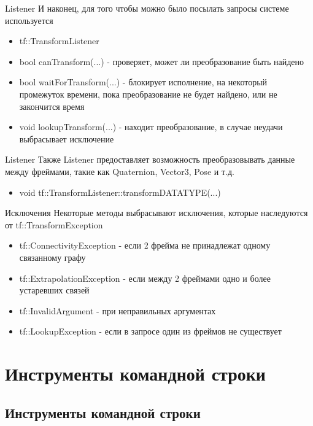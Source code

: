 \documentclass[9pt]{beamer}
\begin{document}
\begin{frame}{Listener}
И наконец, для того чтобы можно было посылать запросы системе используется 
  \begin{itemize}
    \item
    {
      tf::TransformListener
    }
    \item
    {
      bool canTransform(...) - проверяет, может ли преобразование быть найдено
    }
    \item
    {
      bool waitForTransform(...) - блокирует исполнение, на некоторый промежуток времени, пока преобразование не будет найдено, или не закончится время 
    }
    \item
    {
      void lookupTransform(...) - находит преобразование, в случае неудачи выбрасывает исключение
    }
  \end{itemize}
\end{frame}

\begin{frame}{Listener}
Также Listener предоставляет возможность преобразовывать данные между фреймами, такие как Quaternion, Vector3, Pose и т.д.
  \begin{itemize}
    \item
    {
      void tf::TransformListener::transformDATATYPE(...)
    }
  \end{itemize}
\end{frame}

\begin{frame}{Исключения}
Некоторые методы выбрасывают исключения, которые наследуются от tf::TransformException 
  \begin{itemize}
    \item
    {
      tf::ConnectivityException - если 2 фрейма не принадлежат одному связанному графу
    }
    \item
    {
      tf::ExtrapolationException - если между 2 фреймами одно и более устаревших связей
    }
    \item
    {
      tf::InvalidArgument - при неправильных аргументах
    }
    \item
    {
      tf::LookupException - если в запросе один из фреймов не существует 
    }
  \end{itemize}
\end{frame}

\section{Инструменты командной строки}
\subsection{Инструменты командной строки}
\end{document}
